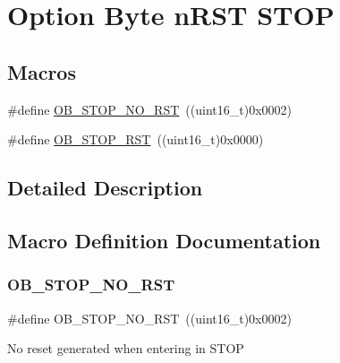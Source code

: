 \hypertarget{group___f_l_a_s_h_ex___o_b__n_r_s_t___s_t_o_p}{}\section{Option Byte n\+R\+ST S\+T\+OP}
\label{group___f_l_a_s_h_ex___o_b__n_r_s_t___s_t_o_p}
\subsection*{Macros}
\begin{DoxyCompactItemize}
\item 
\#define \hyperlink{group___f_l_a_s_h_ex___o_b__n_r_s_t___s_t_o_p_ga7344fe0ec25c5eb2d11db7c855325436}{O\+B\+\_\+\+S\+T\+O\+P\+\_\+\+N\+O\+\_\+\+R\+ST}~((uint16\+\_\+t)0x0002)
\item 
\#define \hyperlink{group___f_l_a_s_h_ex___o_b__n_r_s_t___s_t_o_p_gaef92c03b1f279c532bfa13d3bb074b57}{O\+B\+\_\+\+S\+T\+O\+P\+\_\+\+R\+ST}~((uint16\+\_\+t)0x0000)
\end{DoxyCompactItemize}


\subsection{Detailed Description}


\subsection{Macro Definition Documentation}
\mbox{\label{group___f_l_a_s_h_ex___o_b__n_r_s_t___s_t_o_p_ga7344fe0ec25c5eb2d11db7c855325436}} 
\subsubsection{\texorpdfstring{O\+B\+\_\+\+S\+T\+O\+P\+\_\+\+N\+O\+\_\+\+R\+ST}{OB\_STOP\_NO\_RST}}
{\footnotesize\ttfamily \#define O\+B\+\_\+\+S\+T\+O\+P\+\_\+\+N\+O\+\_\+\+R\+ST~((uint16\+\_\+t)0x0002)}

No reset generated when entering in S\+T\+OP 

